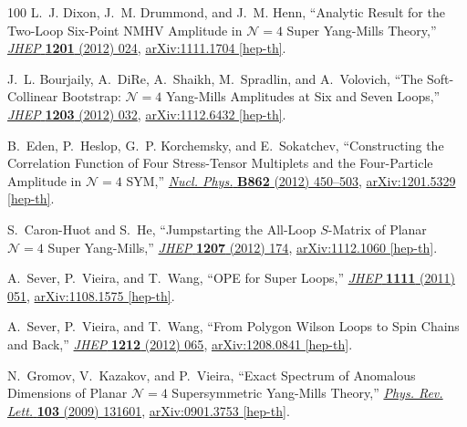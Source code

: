 \documentclass[12pt,hyperref,compress]{JHEP3}
\begin{document}
\begin{thebibliography}{100}
L.~J. Dixon, J.~M. Drummond, and J.~M. Henn, ``{Analytic Result for the
  Two-Loop Six-Point NMHV Amplitude in $\mathcal{N}\!=\!4$ Super Yang-Mills
  Theory},'' \href{http://dx.doi.org/10.1007/JHEP01(2012)024}{{\em JHEP} {\bf
  1201} (2012)  024},
\href{http://arxiv.org/abs/1111.1704}{{ arXiv:1111.1704 [hep-th]}}.

J.~L. Bourjaily, A.~DiRe, A.~Shaikh, M.~Spradlin, and A.~Volovich, ``{The
  Soft-Collinear Bootstrap: $\mathcal{N}\!=\!4$ Yang-Mills Amplitudes at Six
  and Seven Loops},'' \href{http://dx.doi.org/10.1007/JHEP03(2012)032}{{\em
  JHEP} {\bf 1203} (2012)  032},
\href{http://arxiv.org/abs/1112.6432}{{ arXiv:1112.6432 [hep-th]}}.

B.~Eden, P.~Heslop, G.~P. Korchemsky, and E.~Sokatchev, ``{Constructing the
  Correlation Function of Four Stress-Tensor Multiplets and the Four-Particle
  Amplitude in $\mathcal{N}\!=\!4$ SYM},''
  \href{http://dx.doi.org/10.1016/j.nuclphysb.2012.04.013}{{\em Nucl. Phys.}
  {\bf B862} (2012)  450--503},
\href{http://arxiv.org/abs/1201.5329}{{ arXiv:1201.5329 [hep-th]}}.

S.~Caron-Huot and S.~He, ``{Jumpstarting the All-Loop $S$-Matrix of Planar
  $\mathcal{N}\!=\!4$ Super Yang-Mills},''
  \href{http://dx.doi.org/10.1007/JHEP07(2012)174}{{\em JHEP} {\bf 1207} (2012)
   174},
\href{http://arxiv.org/abs/1112.1060}{{ arXiv:1112.1060 [hep-th]}}.

A.~Sever, P.~Vieira, and T.~Wang, ``{OPE for Super Loops},''
  \href{http://dx.doi.org/10.1007/JHEP11(2011)051}{{\em JHEP} {\bf 1111} (2011)
   051},
\href{http://arxiv.org/abs/1108.1575}{{ arXiv:1108.1575 [hep-th]}}.

A.~Sever, P.~Vieira, and T.~Wang, ``{From Polygon Wilson Loops to Spin Chains
  and Back},'' \href{http://dx.doi.org/10.1007/JHEP12(2012)065}{{\em JHEP} {\bf
  1212} (2012)  065},
\href{http://arxiv.org/abs/1208.0841}{{ arXiv:1208.0841 [hep-th]}}.

N.~Gromov, V.~Kazakov, and P.~Vieira, ``{Exact Spectrum of Anomalous Dimensions
  of Planar $\mathcal{N}\!=\!4$ Supersymmetric Yang-Mills Theory},''
  \href{http://dx.doi.org/10.1103/PhysRevLett.103.131601}{{\em Phys. Rev.
  Lett.} {\bf 103} (2009)  131601},
\href{http://arxiv.org/abs/0901.3753}{{ arXiv:0901.3753 [hep-th]}}.


\end{thebibliography}
\end{document}

